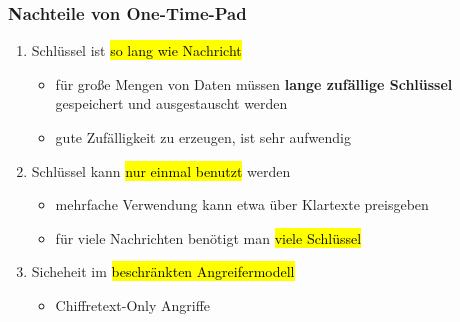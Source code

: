 \documentclass[a4paper, 10pt]{article}
\begin{document}
\subsubsection{Nachteile von One-Time-Pad}
\begin{enumerate}
    \item Schlüssel ist \hl{so lang wie Nachricht}
    \begin{itemize}
        \item für große Mengen von Daten müssen \textbf{lange zufällige Schlüssel} gespeichert und ausgestauscht werden
        \item gute Zufälligkeit zu erzeugen, ist sehr aufwendig
    \end{itemize}


    \item Schlüssel kann \hl{nur einmal benutzt} werden
    \begin{itemize}
        \item mehrfache Verwendung kann etwa über Klartexte preisgeben
        \item für viele Nachrichten benötigt man \hl{viele Schlüssel}
    \end{itemize}


    \item Sicheheit im \hl{beschränkten Angreifermodell}
    \begin{itemize}
        \item Chiffretext-Only Angriffe
    \end{itemize}
\end{enumerate}
\end{document}
